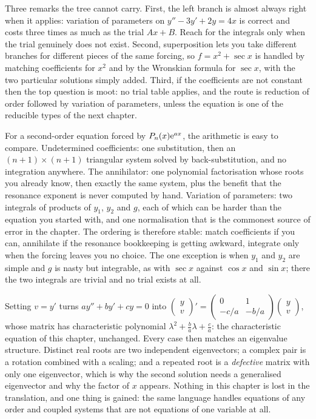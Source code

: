 Three remarks the tree cannot carry. First, the left branch is almost always right when it applies: variation of parameters on $y''-3y'+2y=4x$ is correct and costs three times as much as the trial $Ax+B$. Reach for the integrals only when the trial genuinely does not exist. Second, superposition lets you take different branches for different pieces of the same forcing, so $f=x^{2}+\sec x$ is handled by matching coefficients for $x^{2}$ and by the Wronskian formula for $\sec x$, with the two particular solutions simply added. Third, if the coefficients are not constant then the top question is moot: no trial table applies, and the route is reduction of order followed by variation of parameters, unless the equation is one of the reducible types of the next chapter.

\begin{keynote}
For a second-order equation forced by $P_n(x)\mathrm{e}^{ax}$, the arithmetic is easy to compare. Undetermined coefficients: one substitution, then an $(n+1)\times(n+1)$ triangular system solved by back-substitution, and no integration anywhere. The annihilator: one polynomial factorisation whose roots you already know, then exactly the same system, plus the benefit that the resonance exponent is never computed by hand. Variation of parameters: two integrals of products of $y_1$, $y_2$ and $g$, each of which can be harder than the equation you started with, and one normalisation that is the commonest source of error in the chapter. The ordering is therefore stable: match coefficients if you can, annihilate if the resonance bookkeeping is getting awkward, integrate only when the forcing leaves you no choice. The one exception is when $y_1$ and $y_2$ are simple and $g$ is nasty but integrable, as with $\sec x$ against $\cos x$ and $\sin x$; there the two integrals are trivial and no trial exists at all.
\end{keynote}

\begin{keynote}
Setting $v=y'$ turns $ay''+by'+cy=0$ into $\begin{pmatrix}y\\v\end{pmatrix}'=\begin{pmatrix}0&1\\-c/a&-b/a\end{pmatrix}\begin{pmatrix}y\\v\end{pmatrix}$, whose matrix has characteristic polynomial $\lambda^{2}+\tfrac ba\lambda+\tfrac ca$: the characteristic equation of this chapter, unchanged. Every case then matches an eigenvalue structure. Distinct real roots are two independent eigenvectors; a complex pair is a rotation combined with a scaling; and a repeated root is a \emph{defective} matrix with only one eigenvector, which is why the second solution needs a generalised eigenvector and why the factor of $x$ appears. Nothing in this chapter is lost in the translation, and one thing is gained: the same language handles equations of any order and coupled systems that are not equations of one variable at all.
\end{keynote}


